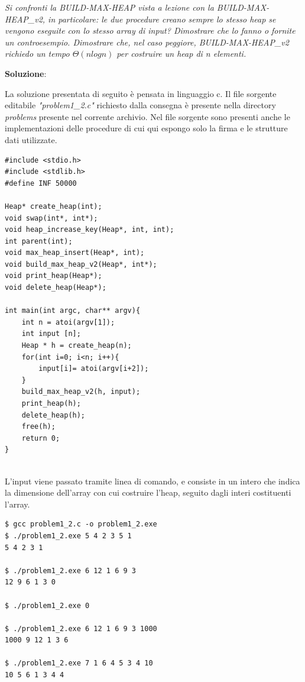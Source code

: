 \documentclass{article}
\begin{document}
\noindent \textit{Si confronti la BUILD-MAX-HEAP vista a lezione con la BUILD-MAX-HEAP\_v2, in particolare: le due procedure creano sempre lo stesso heap se vengono eseguite con lo 
stesso array di input? Dimostrare che lo fanno o fornite un controesempio. Dimostrare che, nel caso peggiore, BUILD-MAX-HEAP\_v2 richiedo un tempo $\Theta(nlogn)$ per costruire un heap di n elementi. }

\vspace{2\baselineskip}
\noindent
\textbf{Soluzione}: 

\noindent
La soluzione presentata di seguito è pensata in linguaggio c. Il file sorgente editabile \textit{"problem1\_2.c"} richiesto dalla consegna è presente nella directory \textit{problems} presente nel corrente archivio. Nel file sorgente sono presenti anche le implementazioni delle procedure di cui qui espongo solo la firma e le strutture dati utilizzate.

\begin{lstlisting}
#include <stdio.h>
#include <stdlib.h>
#define INF 50000

Heap* create_heap(int);
void swap(int*, int*);
void heap_increase_key(Heap*, int, int);
int parent(int);
void max_heap_insert(Heap*, int);
void build_max_heap_v2(Heap*, int*);
void print_heap(Heap*);
void delete_heap(Heap*);

int main(int argc, char** argv){
    int n = atoi(argv[1]);
    int input [n];
    Heap * h = create_heap(n);
    for(int i=0; i<n; i++){
        input[i]= atoi(argv[i+2]);
    }
    build_max_heap_v2(h, input);
    print_heap(h);
    delete_heap(h);
    free(h);
    return 0;
}


\end{lstlisting}
\noindent
L'input viene passato tramite linea di comando, e consiste in un intero che indica la dimensione dell'array con cui costruire l'heap, seguito dagli interi costituenti l'array. 



\begin{commandline}
\begin{verbatim}
$ gcc problem1_2.c -o problem1_2.exe
$ ./problem1_2.exe 5 4 2 3 5 1 
5 4 2 3 1

$ ./problem1_2.exe 6 12 1 6 9 3 
12 9 6 1 3 0 

$ ./problem1_2.exe 0

$ ./problem1_2.exe 6 12 1 6 9 3 1000
1000 9 12 1 3 6

$ ./problem1_2.exe 7 1 6 4 5 3 4 10
10 5 6 1 3 4 4

\end{verbatim}
\end{commandline}
\end{document}
